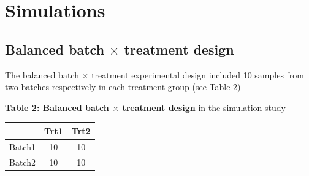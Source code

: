 \documentclass[
]{book}
\begin{document}
\hypertarget{simulations}{%
\section{Simulations}\label{simulations}}

\hypertarget{balanced-batch-times-treatment-design}{%
\subsection{\texorpdfstring{Balanced batch \(\times\) treatment design}{Balanced batch \textbackslash times treatment design}}\label{balanced-batch-times-treatment-design}}

The balanced batch \(\times\) treatment experimental design included 10 samples from two batches respectively in each treatment group (see Table 2)

\textbf{Table 2: Balanced batch \(\times\) treatment design} in the simulation study

\begin{longtable}[]{@{}ccc@{}}
\toprule()
& Trt1 & Trt2 \\
\midrule()
\endhead
Batch1 & 10 & 10 \\
Batch2 & 10 & 10 \\
\bottomrule()
\end{longtable}
\end{document}
